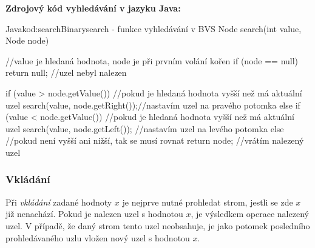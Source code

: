 \documentclass[
  biblatex=false,
  font=serif,
  glossaries=false,
  tables=false,
  theorems=false,
  index
]{kidiplom}
\begin{document}
\medskip \medskip \medskip
\noindent \textbf{Zdrojový kód vyhledávání v jazyku Java:}

\begin{kicode}{Java}{kod:searchBinary}{search - funkce vyhledávání v BVS}
Node search(int value, Node node) { //value je hledaná hodnota, node je při prvním volání kořen
	if (node == null) {
		return null; //uzel nebyl nalezen
	}
	
	if (value > node.getValue()) {//pokud je hledaná hodnota vyšší než má aktuální uzel
		search(value, node.getRight());//nastavím uzel na pravého potomka
	} else if (value < node.getValue()) { //pokud je hledaná hodnota vyšší než má aktuální uzel
		search(value, node.getLeft()); //nastavím uzel na levého potomka
	} else { //pokud není vyšší ani nižší, tak se musí rovnat
		return node; //vrátím nalezený uzel
	}
}
\end{kicode}


\newpage
\subsubsection{Vkládání}
\indent\indent Při \textit{vkládání} zadané hodnoty $x$ je nejprve nutné prohledat strom, jestli se zde $x$ již nenachází. Pokud je nalezen uzel s hodnotou $x$, je výsledkem operace nalezený uzel. V případě, že daný strom tento uzel neobsahuje, je jako potomek posledního prohledávaného uzlu vložen nový uzel s hodnotou $x$. \\
\end{document}

